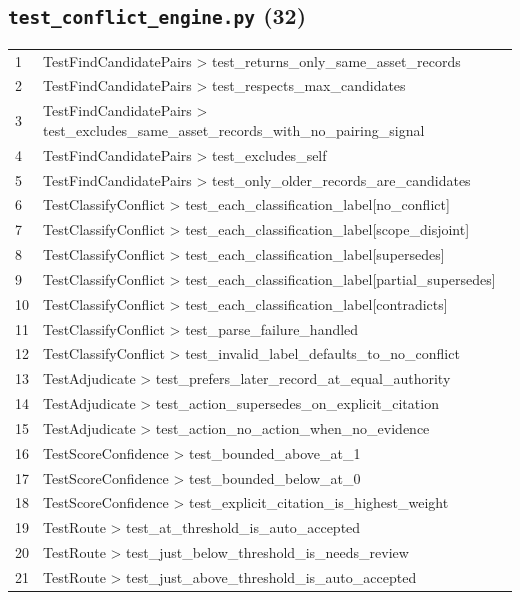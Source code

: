 \subsection*{\texttt{test\_conflict\_engine.py} (32)}
\begin{longtable}{p{}p{}}
1 & TestFindCandidatePairs > test\_returns\_only\_same\_asset\_records \\
2 & TestFindCandidatePairs > test\_respects\_max\_candidates \\
3 & TestFindCandidatePairs > test\_excludes\_same\_asset\_records\_with\_no\_pairing\_signal \\
4 & TestFindCandidatePairs > test\_excludes\_self \\
5 & TestFindCandidatePairs > test\_only\_older\_records\_are\_candidates \\
6 & TestClassifyConflict > test\_each\_classification\_label[no\_conflict] \\
7 & TestClassifyConflict > test\_each\_classification\_label[scope\_disjoint] \\
8 & TestClassifyConflict > test\_each\_classification\_label[supersedes] \\
9 & TestClassifyConflict > test\_each\_classification\_label[partial\_supersedes] \\
10 & TestClassifyConflict > test\_each\_classification\_label[contradicts] \\
11 & TestClassifyConflict > test\_parse\_failure\_handled \\
12 & TestClassifyConflict > test\_invalid\_label\_defaults\_to\_no\_conflict \\
13 & TestAdjudicate > test\_prefers\_later\_record\_at\_equal\_authority \\
14 & TestAdjudicate > test\_action\_supersedes\_on\_explicit\_citation \\
15 & TestAdjudicate > test\_action\_no\_action\_when\_no\_evidence \\
16 & TestScoreConfidence > test\_bounded\_above\_at\_1 \\
17 & TestScoreConfidence > test\_bounded\_below\_at\_0 \\
18 & TestScoreConfidence > test\_explicit\_citation\_is\_highest\_weight \\
19 & TestRoute > test\_at\_threshold\_is\_auto\_accepted \\
20 & TestRoute > test\_just\_below\_threshold\_is\_needs\_review \\
21 & TestRoute > test\_just\_above\_threshold\_is\_auto\_accepted \\

\end{longtable}
